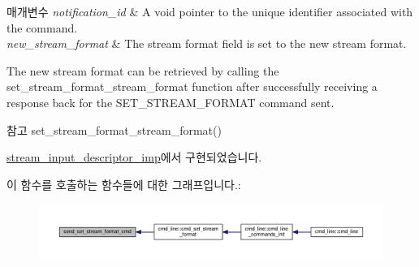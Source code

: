 \begin{DoxyParams}{매개변수}
{\em notification\+\_\+id} & A void pointer to the unique identifier associated with the command. \\
\hline
{\em new\+\_\+stream\+\_\+format} & The stream format field is set to the new stream format.\\
\hline
\end{DoxyParams}
The new stream format can be retrieved by calling the set\+\_\+stream\+\_\+format\+\_\+stream\+\_\+format function after successfully receiving a response back for the S\+E\+T\+\_\+\+S\+T\+R\+E\+A\+M\+\_\+\+F\+O\+R\+M\+AT command sent.

\begin{DoxySeeAlso}{참고}
set\+\_\+stream\+\_\+format\+\_\+stream\+\_\+format() 
\end{DoxySeeAlso}


\hyperlink{classavdecc__lib_1_1stream__input__descriptor__imp_ad5c08ba242703c9d0f6cab2b08d6aad6}{stream\+\_\+input\+\_\+descriptor\+\_\+imp}에서 구현되었습니다.



이 함수를 호출하는 함수들에 대한 그래프입니다.\+:
\nopagebreak
\begin{figure}[H]
\begin{center}
\leavevmode
\includegraphics[width=350pt]{classavdecc__lib_1_1stream__input__descriptor_a7407f2ca9a5a63a404e5f96ccdbf31f3_icgraph}
\end{center}
\end{figure}


